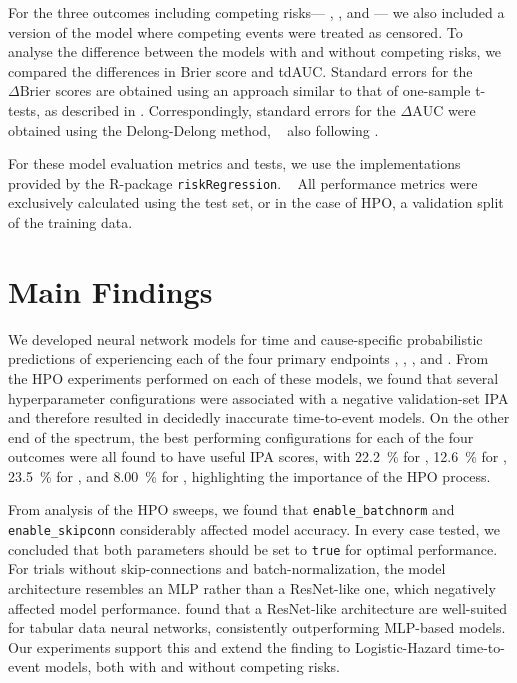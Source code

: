 For the three outcomes including competing risks---%
, , and ---%
we also included a version of the model where 
competing events were treated as censored.
To analyse the difference between the models 
with and without competing risks, 
we compared the differences in Brier score and \ac{tdAUC}.
Standard errors for the \(\Delta\mathrm{Brier}\) scores are obtained
using an approach similar to that of one-sample t-tests, 
as described in \textcite{gerdsMedical2021}.
Correspondingly, 
standard errors for the \(\Delta \mathrm{AUC}\) 
were obtained using the Delong-Delong method,
~\autocite{delongComparing1988}
also following \textcite{gerdsMedical2021}.

For these model evaluation metrics and tests, 
we use the implementations provided by the R-package \texttt{riskRegression}.
~\autocite{gerdsRiskRegression2023}
All performance metrics were exclusively calculated using 
the test set, or in the case of \ac{HPO}, a validation split of 
the training data.

\section{Main Findings}

We developed neural network models for
time and cause-specific probabilistic predictions of 
experiencing each of the four primary endpoints 
, , , and .
From the \ac{HPO} experiments performed on each of these models,
we found that several hyperparameter configurations were associated
with a negative validation-set \ac{IPA} and therefore resulted in 
decidedly inaccurate time-to-event models.
On the other end of the spectrum, 
the best performing configurations for each of the four outcomes
were all found to have useful \ac{IPA} scores,
with 
\qty{22.2}{\percent} for ,
\qty{12.6}{\percent} for ,
\qty{23.5}{\percent} for ,
and 
\qty{8.00}{\percent} for ,
highlighting the importance of the \ac{HPO} process.

From analysis of the \ac{HPO} sweeps,
we found that \verb|enable_batchnorm| and \verb|enable_skipconn| 
considerably affected model accuracy. 
In every case tested, 
we concluded that both parameters should be set to
\verb|true| for optimal performance. 
For trials without skip-connections and batch-normalization,
the model architecture resembles an \ac{MLP}
rather than a ResNet-like one,
which negatively affected model performance.
\textcite{gorishniyRevisiting2023} 
found that a ResNet-like architecture are well-suited for
tabular data neural networks, 
consistently outperforming \ac{MLP}-based models.
Our experiments support this and extend the finding 
to Logistic-Hazard time-to-event models,
both with and without competing risks.


